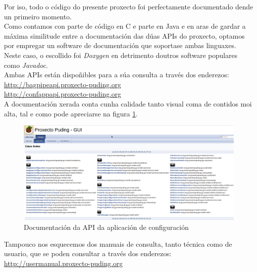  Por iso, todo o código do presente proxecto foi perfectamente documentado dende
 un primeiro momento. \\
 
 Como contamos con parte de código en C e parte en Java e en aras de gardar a
 máxima similitude entre a documentación das dúas APIs do proxecto, optamos por
 empregar un software de documentación que soportase ambas linguaxes. Neste
 caso, o escollido foi \textit{Doxygen} \cite{Doxygen} en detrimento doutros
 software populares como \textit{Javadoc}. \\
 
 Ambas APIs están dispoñibles para a súa consulta a través dos enderezos: \\
 
 \url{http://bagpipeapi.proxecto-puding.org} \\
 
 \url{http://confappapi.proxecto-puding.org} \\
 
 A documentación xerada conta cunha calidade tanto visual coma de contidos moi
 alta, tal e como pode apreciarse na figura \ref{figura:ConAppApi}. \\
 
 \begin{figure}[htbp]
  \centering
  \includegraphics[scale=0.4,angle=90,keepaspectratio=true]{./imagenes/confapp-api.png}
  \caption{Documentación da API da aplicación de configuración}
  \label{figura:ConAppApi}
 \end{figure}
 
 Tampouco nos esquecemos dos manuais de consulta, tanto técnica como de usuario,
 que se poden consultar a través dos enderezos: \\

 \url{http://usermanual.proxecto-puding.org} \\
 
